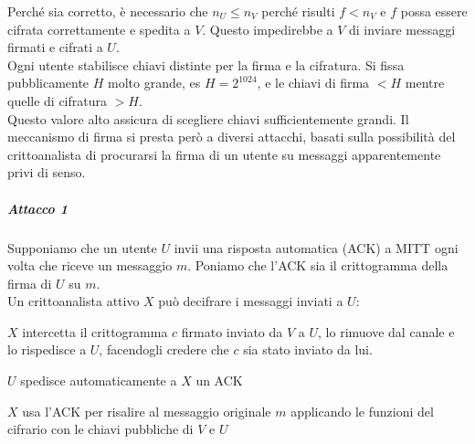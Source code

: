 \documentclass[10pt]{book}
\begin{document}
Perché sia corretto, è necessario che $n_U\leq n_V$ perché risulti $f< n_V$ e $f$ possa essere cifrata correttamente e spedita a $V$. Questo impedirebbe a $V$ di inviare messaggi firmati e cifrati a $U$.\\
Ogni utente stabilisce chiavi distinte per la firma e la cifratura. Si fissa pubblicamente $H$ molto grande, es $H = 2^{1024}$, e le chiavi di firma $ < H$ mentre quelle di cifratura $> H$.\\
Questo valore alto assicura di scegliere chiavi sufficientemente grandi. Il meccanismo di firma si presta però a diversi attacchi, basati sulla possibilità del crittoanalista di procurarsi la firma di un utente su messaggi apparentemente privi di senso.
\pagebreak
\subparagraph{Attacco 1} Supponiamo che un utente $U$ invii una risposta automatica (ACK) a MITT ogni volta che riceve un messaggio $m$. Poniamo che l'ACK sia il crittogramma della firma di $U$ su $m$.\\
Un crittoanalista attivo $X$ può decifrare i messaggi inviati a $U$:
\begin{list}{}{}
	\item $X$ intercetta il crittogramma $c$ firmato inviato da $V$ a $U$, lo rimuove dal canale e lo rispedisce a $U$, facendogli credere che $c$ sia stato inviato da lui.
	\item $U$ spedisce automaticamente a $X$ un ACK
	\item $X$ usa l'ACK per risalire al messaggio originale $m$ applicando le funzioni del cifrario con le chiavi pubbliche di $V$ e $U$
\end{list}
\end{document}

